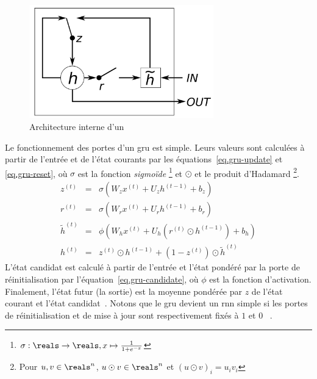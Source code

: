 \begin{figure}[htb]
    \begin{center}
        \includegraphics[width=8cm]{assets/images/gru-circuit.png}
    \end{center}
    \caption{Architecture interne d'un ~\cite[Fig. 1b]{Chung_Gulcehre_Cho_Bengio_2014}}
    \label{fig.gru-circuit}
\end{figure}

Le fonctionnement des portes d'un \gls{gru} est simple.
Leurs valeurs sont calculées à partir de l'entrée et de l'état courants par
les équations~\ref{eq.gru-update} et \ref{eq.gru-reset}, 
où \(\sigma\) est la fonction \emph{sigmoïde}%
\footnote{\(\sigma:\reals\to\reals, x\mapsto\frac{1}{1+e^{-x}}\)}
et \(\odot\) et le produit d'Hadamard%
\footnote{Pour \(u, v\in\reals^n\), \(u\odot v\in\reals^n\) et \((u\odot v)_i = u_i v_i\)}.
\begin{eqnarray}
    \label{eq.gru-update}
    z^{(t)}  &=&\sigma\left(W_z x^{(t)}+U_z h^{(t-1)}+b_z\right) \\
    \label{eq.gru-reset}
    r^{(t)}  &=&\sigma\left(W_r x^{(t)}+U_r h^{(t-1)}+b_r\right) \\
    \label{eq.gru-candidate}
    \tilde{h}^{(t)}  &=&\phi\left(W_h x^{(t)}+U_h\left(r^{(t)} \odot h^{(t-1)}\right)+b_h\right) \\
    \label{eq.gru-out}
    h^{(t)}  &=&z^{(t)} \odot h^{(t-1)}+\left(1-z^{(t)}\right) \odot \tilde{h}^{(t)}
\end{eqnarray}
L'état candidat est calculé à partir de l'entrée et l'état pondéré par la porte de réinitialisation
par l'équation~\ref{eq.gru-candidate}, où \(\phi\) est la fonction d'activation.
Finalement, l'état futur (la sortie) est la moyenne pondérée par \(z\) 
de l'état courant et l'état candidat~\cite{Cho_van_Merrienboer_Bahdanau_Bengio_2014}.
Notons que le \gls{gru} devient un \gls{rnn} simple 
si les portes de réinitialisation et de mise à jour sont respectivement fixés à \(1\) et \(0\)%
~\cite{Fathi_2021}.

